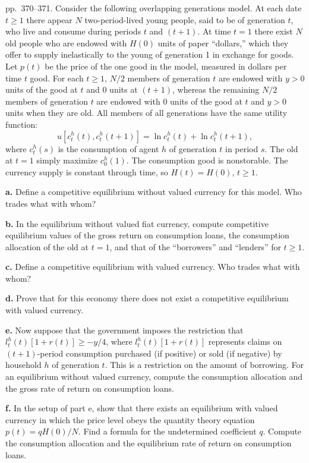 \documentclass[12pt, letterpaper]{article}
\begin{document}
\begin{tcolorbox}[oddbox,title={Exercise 9.7 \quad Credit controls}]
\begin{tcolorbox}[questionbox]
pp.~370--371. Consider the following overlapping generations model. At each date $t\ge1$ there
appear $N$ two-period-lived young people, said to be of generation $t$, who live and consume during
periods $t$ and $(t+1)$. At time $t=1$ there exist $N$ old people who are endowed with $H(0)$ units of
paper ``dollars,'' which they offer to supply inelastically to the young of generation 1 in exchange
for goods. Let $p(t)$ be the price of the one good in the model, measured in dollars per time $t$
good. For each $t\ge1$, $N/2$ members of generation $t$ are endowed with $y>0$ units of the good at
$t$ and $0$ units at $(t+1)$, whereas the remaining $N/2$ members of generation $t$ are endowed with
$0$ units of the good at $t$ and $y>0$ units when they are old. All members of all generations have
the same utility function:
\[
u[c_t^h(t),c_t^h(t+1)]=\ln c_t^h(t)+\ln c_t^h(t+1),
\]
where $c_t^h(s)$ is the consumption of agent $h$ of generation $t$ in period $s$. The old at $t=1$
simply maximize $c_0^h(1)$. The consumption good is nonstorable. The currency supply is constant
through time, so $H(t)=H(0)$, $t\ge1$.

\textbf{a.} Define a competitive equilibrium without valued currency for this model. Who trades what
with whom?

\textbf{b.} In the equilibrium without valued fiat currency, compute competitive equilibrium values
of the gross return on consumption loans, the consumption allocation of the old at $t=1$, and that of
the ``borrowers'' and ``lenders'' for $t\ge1$.

\textbf{c.} Define a competitive equilibrium with valued currency. Who trades what with whom?

\textbf{d.} Prove that for this economy there does not exist a competitive equilibrium with valued
currency.

\textbf{e.} Now suppose that the government imposes the restriction that
$l_t^h(t)[1+r(t)]\ge-y/4$, where $l_t^h(t)[1+r(t)]$ represents claims on $(t+1)$-period consumption
purchased (if positive) or sold (if negative) by household $h$ of generation $t$. This is a
restriction on the amount of borrowing. For an equilibrium without valued currency, compute the
consumption allocation and the gross rate of return on consumption loans.

\textbf{f.} In the setup of part e, show that there exists an equilibrium with valued currency in
which the price level obeys the quantity theory equation $p(t)=qH(0)/N$. Find a formula for the
undetermined coefficient $q$. Compute the consumption allocation and the equilibrium rate of return
on consumption loans.


\end{tcolorbox}
\end{tcolorbox}
\end{document}
